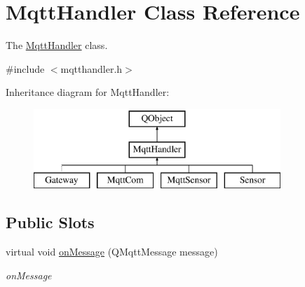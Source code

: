 \hypertarget{classMqttHandler}{}\section{Mqtt\+Handler Class Reference}
\label{classMqttHandler}


The \hyperlink{classMqttHandler}{Mqtt\+Handler} class.  




{\ttfamily \#include $<$mqtthandler.\+h$>$}

Inheritance diagram for Mqtt\+Handler\+:\begin{figure}[H]
\begin{center}
\leavevmode
\includegraphics[height=3.000000cm]{classMqttHandler}
\end{center}
\end{figure}
\subsection*{Public Slots}
\begin{DoxyCompactItemize}
\item 
virtual void \hyperlink{classMqttHandler_acfaf00fbb740ea1c01c747c614a04c28}{on\+Message} (Q\+Mqtt\+Message message)
\begin{DoxyCompactList}\small\item\em on\+Message \end{DoxyCompactList}\end{DoxyCompactItemize}
